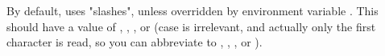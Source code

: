 \stopalignment

\noindent{}By default, \display{} uses "slashes", unless overridden by
environment variable . This should have a
value of , , , or 
(case is irrelevant, and actually only the first character is read, so you can
abbreviate to , , , or ).

% 
% 
% 
% 
% 
